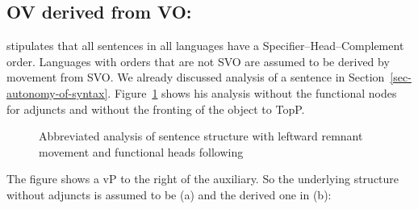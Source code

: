 \subsection{OV derived from VO: \citet{Kayne94a-u}}
\label{sec-ov-derived-from-vo}


\largerpage
\citet{Kayne94a-u} stipulates that all sentences in all languages have a Specifier–Head–Complement
order. Languages with orders that are not SVO are assumed to be derived by movement from SVO. We
already discussed  analysis of a  sentence in
Section~\ref{sec-autonomy-of-syntax}. Figure~\ref{fig-Kayne-for-German} shows his analysis without
the functional nodes for adjuncts and without the fronting of the object to TopP.


\begin{figure}
\scalebox{.93}{%
\begin{forest}
sm edges
[CP
	[C$^0$[weil;because, tier=word]]
		[SubjP
			[DP$_i$ [der Mann;the man,roof]]
				[ObjP
					[DP$_j$ [diese Sonate;this sonata,roof]]
								[AuxP
									[VP$_k$ [gespielt;played,tier=word]]
									[Aux+
										[Aux [hat;has,tier=word]]
										[vP
											[DP$_i$ [,phantom]]
											[VP$_k$
												[V [,phantom]]
												[DP$_j$
                                                                                                  [,phantom]]]]]]]]]
\end{forest}%
}
\caption{\label{fig-Kayne-for-German}Abbreviated analysis of sentence structure with leftward remnant movement
  and functional heads following \citet[]{Laenzlinger2004a}}
\end{figure}%

The figure shows a vP to the right of the auxiliary. So the underlying structure without adjuncts is assumed to be
(a) and the derived one in (b):
\eal
{}
\zl

